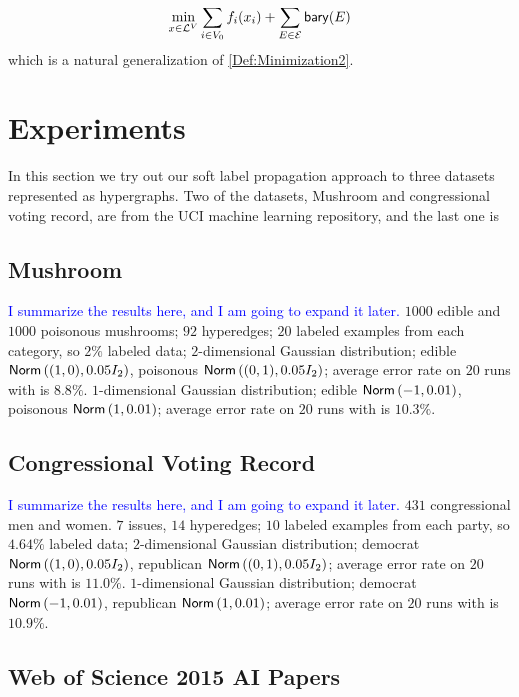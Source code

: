 \documentclass[letterpaper]{article} %
\begin{document}
$$\min_{x\in {\mathcal L}^V} \sum_{i\in V_0} f_i(x_i) + \sum_{E\in \mathcal E} \mathsf{bary}(E)$$
which is a natural generalization of \eqref{Def:Minimization2}.




	




\section{Experiments}
In this section we try out our soft label propagation approach to three datasets represented as hypergraphs. Two of the datasets, Mushroom and congressional voting record, are from the UCI machine learning repository, and the last one is 
\subsection{Mushroom}
\textcolor{blue}{I summarize the results here, and I am going to expand it later.}
$1000$ edible and $1000$ poisonous mushrooms; 
$92$ hyperedges;
$20$ labeled examples from each category, so $2\%$ labeled data;
$2$-dimensional Gaussian distribution; edible $\mathsf{Norm}\left((1, 0), 0.05I_2\right)$, poisonous $\mathsf{Norm}\left((0, 1), 0.05I_2\right)$; average error rate on $20$ runs with is $8.8\%$.
$1$-dimensional Gaussian distribution; edible $\mathsf{Norm}\left(-1, 0.01\right)$, poisonous $\mathsf{Norm}\left(1, 0.01\right)$; average error rate on $20$ runs with is $10.3\%$.


\subsection{Congressional Voting Record}
\textcolor{blue}{I summarize the results here, and I am going to expand it later.}
$431$ congressional men and women. $7$ issues, $14$ hyperedges;
$10$ labeled examples from each party, so $4.64\%$ labeled data;
$2$-dimensional Gaussian distribution; democrat $\mathsf{Norm}\left((1, 0), 0.05I_2\right)$, republican $\mathsf{Norm}\left((0, 1), 0.05I_2\right)$; average error rate on $20$ runs with is $11.0\%$.
$1$-dimensional Gaussian distribution; democrat $\mathsf{Norm}\left(-1, 0.01\right)$, republican $\mathsf{Norm}\left(1, 0.01\right)$; average error rate on $20$ runs with is $10.9\%$.

\subsection{Web of Science 2015 AI Papers}
\end{document}
